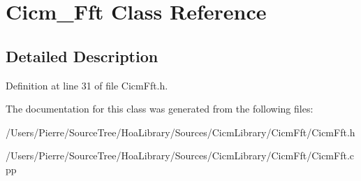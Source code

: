 \hypertarget{class_cicm___fft}{\section{Cicm\-\_\-\-Fft Class Reference}
\label{class_cicm___fft}
}


\subsection{Detailed Description}


Definition at line 31 of file Cicm\-Fft.\-h.



The documentation for this class was generated from the following files\-:\begin{DoxyCompactItemize}
\item 
/\-Users/\-Pierre/\-Source\-Tree/\-Hoa\-Library/\-Sources/\-Cicm\-Library/\-Cicm\-Fft/Cicm\-Fft.\-h\item 
/\-Users/\-Pierre/\-Source\-Tree/\-Hoa\-Library/\-Sources/\-Cicm\-Library/\-Cicm\-Fft/Cicm\-Fft.\-cpp\end{DoxyCompactItemize}
